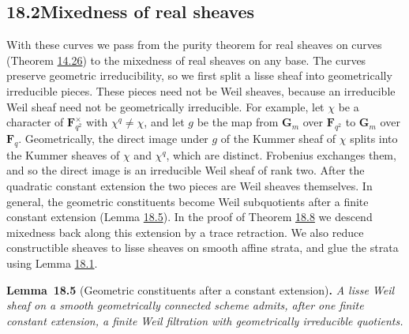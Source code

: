 \documentclass[11pt]{article}
\newenvironment{bpstatement}[2]{\par\addvspace{0.6\baselineskip}\noindent\textbf{#1}#2\textbf{.}\enspace\ignorespaces}
  {\par\addvspace{0.4\baselineskip}}
\newenvironment{bpstatementit}[2]{\begin{bpstatement}{#1}{#2}\itshape\ignorespaces}{\end{bpstatement}}
\begin{document}
\subsection*{\texorpdfstring{18.2\quad Mixedness of real sheaves}{18.2 Mixedness of real sheaves}}
\label{bp286}%
\label{bp287}%
With these curves we pass from the purity theorem for real sheaves on curves (Theorem \hyperref[bp120]{14.26}) to the mixedness of real sheaves on any base. The curves preserve geometric irreducibility, so we first split a lisse sheaf into geometrically irreducible pieces. These pieces need not be Weil sheaves, because an irreducible Weil sheaf need not be geometrically irreducible. For example, let \(\chi\) be a character of \(\mathbf F_{q^2}^\times\) with \(\chi^q\ne\chi\), and let \(g\) be the map from \(\mathbf G_m\) over \(\mathbf F_{q^2}\) to \(\mathbf G_m\) over \(\mathbf F_q\). Geometrically, the direct image under \(g\) of the Kummer sheaf of \(\chi\) splits into the Kummer sheaves of \(\chi\) and \(\chi^q\), which are distinct. Frobenius exchanges them, and so the direct image is an irreducible Weil sheaf of rank two. After the quadratic constant extension the two pieces are Weil sheaves themselves. In general, the geometric constituents become Weil subquotients after a finite constant extension (Lemma \hyperref[bp288]{18.5}). In the proof of Theorem \hyperref[bp295]{18.8} we descend mixedness back along this extension by a trace retraction. We also reduce constructible sheaves to lisse sheaves on smooth affine strata, and glue the strata using Lemma \hyperref[bp275]{18.1}.

\label{bp288}%
\begin{bpstatementit}{Lemma~18.5}{ (Geometric constituents after a constant extension)}
A lisse Weil sheaf on a smooth geometrically connected scheme admits, after one finite constant extension, a finite Weil filtration with geometrically irreducible quotients.
\end{bpstatementit}
\end{document}
